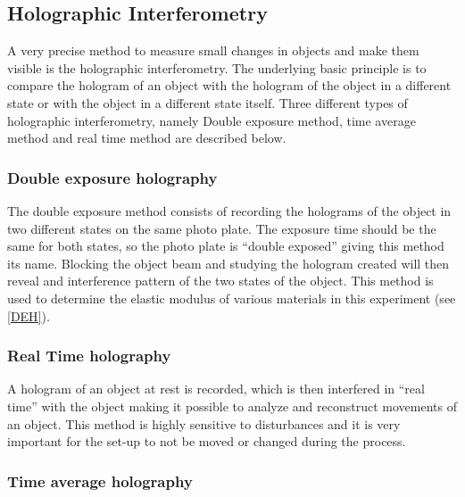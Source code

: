 

\subsection{Holographic Interferometry}

A very precise method to measure small changes in objects and make them visible is the holographic interferometry. The underlying basic principle is to compare the hologram of an object with the hologram of the object in a different state or with the object in a different state itself. Three different types of holographic interferometry, namely Double exposure method, time average method and real time method are described below.

\subsubsection{Double exposure holography}

The double exposure method consists of recording the holograms of the object in two different states on the same photo plate. The exposure time should be the same for both states, so the photo plate is ``double exposed'' giving this method its name. Blocking the object beam and studying the hologram created will then reveal and interference pattern of the two states of the object. This method is used to determine the elastic modulus of various materials in this experiment (see \ref{DEH}).

\subsubsection{Real Time holography}

A hologram of an object at rest is recorded, which is then interfered in ``real time'' with the object making it possible to analyze  and reconstruct movements of an object. This method is highly sensitive to disturbances and it is very important for the set-up to not be moved or changed during the process. 

\subsubsection{Time average holography}

